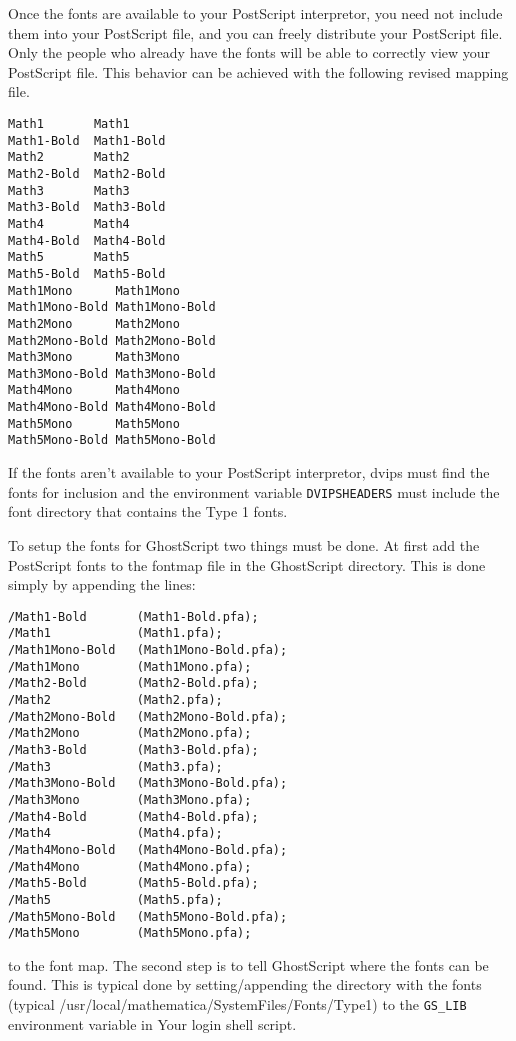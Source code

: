 \documentclass{article}
\begin{document}
Once the fonts are available to your PostScript interpretor,
you need not include them into your PostScript file, and you
can freely distribute your PostScript file. 
Only the people who already have the 
\MathLogo{} fonts will be able to correctly 
view your PostScript file.  This behavior can
be achieved with the following revised mapping file.

\goodbreak

\begin{verbatim}
Math1       Math1
Math1-Bold  Math1-Bold
Math2       Math2
Math2-Bold  Math2-Bold
Math3       Math3 
Math3-Bold  Math3-Bold
Math4       Math4
Math4-Bold  Math4-Bold
Math5       Math5
Math5-Bold  Math5-Bold
Math1Mono      Math1Mono 
Math1Mono-Bold Math1Mono-Bold
Math2Mono      Math2Mono 
Math2Mono-Bold Math2Mono-Bold
Math3Mono      Math3Mono
Math3Mono-Bold Math3Mono-Bold 
Math4Mono      Math4Mono
Math4Mono-Bold Math4Mono-Bold
Math5Mono      Math5Mono
Math5Mono-Bold Math5Mono-Bold
\end{verbatim}
%
If the \MathLogo{} fonts aren't available to your PostScript
interpretor,
\textsf{dvips} must find the  fonts for inclusion and
the environment variable \texttt{DVIPSHEADERS} must include
the \MathLogo{} font directory that contains the Type 1 fonts.

To setup the fonts for GhostScript two things must be done. At first add 
the PostScript fonts to the \textsf{fontmap} file in the GhostScript 
directory. This is done simply by appending the lines:
\begin{verbatim}
/Math1-Bold       (Math1-Bold.pfa);
/Math1            (Math1.pfa);
/Math1Mono-Bold   (Math1Mono-Bold.pfa);
/Math1Mono        (Math1Mono.pfa);
/Math2-Bold       (Math2-Bold.pfa);
/Math2            (Math2.pfa);
/Math2Mono-Bold   (Math2Mono-Bold.pfa);
/Math2Mono        (Math2Mono.pfa);
/Math3-Bold       (Math3-Bold.pfa);
/Math3            (Math3.pfa);
/Math3Mono-Bold   (Math3Mono-Bold.pfa);
/Math3Mono        (Math3Mono.pfa);
/Math4-Bold       (Math4-Bold.pfa);
/Math4            (Math4.pfa);
/Math4Mono-Bold   (Math4Mono-Bold.pfa);
/Math4Mono        (Math4Mono.pfa);
/Math5-Bold       (Math5-Bold.pfa);
/Math5            (Math5.pfa);
/Math5Mono-Bold   (Math5Mono-Bold.pfa);
/Math5Mono        (Math5Mono.pfa);
\end{verbatim}
to the font map. The second step is to tell GhostScript where the fonts can be found.
This is typical done by setting/appending the directory with the \MathLogo{} fonts
(typical \textsf{/usr/local/mathematica/SystemFiles/Fonts/Type1})
to the \verb|GS_LIB| environment variable in Your login shell script.
\end{document}
